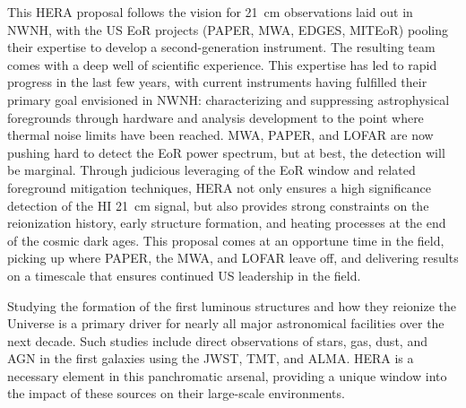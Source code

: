 \documentclass[preprint]{aastex}
\def\HI{{H{\small I }}}
\begin{document}
This HERA proposal follows the vision for 21~cm observations laid out in NWNH,
with the US EoR projects (PAPER, MWA, EDGES, MITEoR) pooling their expertise to
develop a second-generation instrument.  The resulting team comes with a deep
well of scientific experience.
This expertise has led to rapid progress in the last few years, with current
instruments having fulfilled their primary goal envisioned in NWNH:
characterizing and suppressing astrophysical foregrounds through hardware and
analysis development to the point where thermal noise limits have been
reached.  MWA, PAPER, and LOFAR are now pushing hard to detect the EoR power
spectrum, but at best, the detection will be marginal.  Through judicious
leveraging of the EoR window and related foreground mitigation techniques, HERA
not only ensures a high significance detection of the \HI 21~cm signal, but
also provides strong constraints on the reionization history,
early structure formation, and heating processes at
the end of the cosmic dark ages.
This proposal comes at an
opportune time in the field, picking up where PAPER, the MWA, and LOFAR leave
off, and delivering results on a timescale that ensures continued US leadership in the field.

Studying the formation of the first luminous structures 
and how they reionize the Universe is a primary driver for 
nearly all major astronomical facilities over the next decade.
Such studies include direct  observations of stars, gas, dust, and AGN in the
first galaxies using the JWST, TMT, and ALMA. HERA is 
a necessary element in this panchromatic arsenal, 
providing a unique window into the impact of these sources on 
their large-scale environments.


\clearpage
\setcounter{page}{1}
\thispagestyle{empty}
%
%

%

\end{document}
